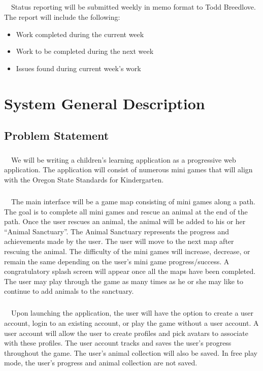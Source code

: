 \documentclass[12pt]{report}
\begin{document}
		\paragraph{}\ \ Status reporting will be submitted weekly in memo format to Todd Breedlove. The report will include the following:
		
		\begin{itemize}
			\item Work completed during the current week
			\item Work to be completed during the next week
			\item Issues found during current week’s work
		\end{itemize}
		
\chapter{System General Description}
\thispagestyle{fancy}
	\section{Problem Statement}
		\paragraph{}\ \ We will be writing a children's learning application as a progressive web application. The application will consist of numerous mini games that will align with the Oregon State Standards for Kindergarten.
		
		\paragraph{}\ \ The main interface will be a game map consisting of mini games along a path. The goal is to complete all mini games and rescue an animal at the end of the path. Once the user rescues an animal, the animal will be added to his or her “Animal Sanctuary”. The Animal Sanctuary represents the progress and achievements made by the user. The user will move to the next map after rescuing the animal. The difficulty of the mini games will increase, decrease, or remain the same depending on the user's mini game progress/success. A congratulatory splash screen will appear once all the maps have been completed. The user may play through the game as many times as he or she may like to continue to add animals to the sanctuary.
				
		\paragraph{}\ \ Upon launching the application, the user will have the option to create a user account, login to an existing account, or play the game without a user account. A user account will allow the user to create profiles and pick avatars to associate with these profiles. The user account tracks and saves the user's progress throughout the game. The user's animal collection will also be saved. In free play mode, the user's progress and animal collection are not saved. 
		
\end{document}
